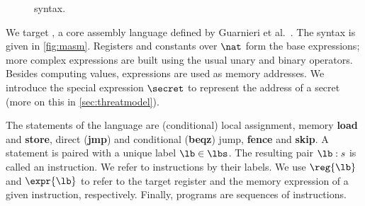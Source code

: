\documentclass[conference]{IEEEtran}
\begin{document}
\begin{figure}[t]
\setlength{\tabcolsep}{3pt}
\caption{\masm syntax.}
\label{fig:masm}
\end{figure}


We target \masm, a core assembly language defined by Guarnieri et al.~\cite{GuarnieriKMRS20}. The syntax is given in \autoref{fig:masm}.
Registers and constants over $\nat$ form the base expressions;
more complex expressions are built using the usual unary and binary operators.
Besides computing values, expressions are used as memory addresses.
We introduce the special expression $\secret$ to represent the address of a secret (more on this in \autoref{sec:threatmodel}).

The statements of the \masm language are (conditional) local assignment, memory \textbf{load} and \textbf{store}, direct (\textbf{jmp}) and conditional (\textbf{beqz}) jump, \textbf{fence} and \textbf{skip}.
A statement is paired with a unique label $\lb \in \lbs$.
The resulting pair $\lb : s$ is called an instruction.
We refer to instructions by their labels.
We use $\reg{\lb}$ and $\expr{\lb}$ to refer to the target register and the memory expression of a given instruction, respectively.
Finally, programs are sequences of instructions.
\end{document}
